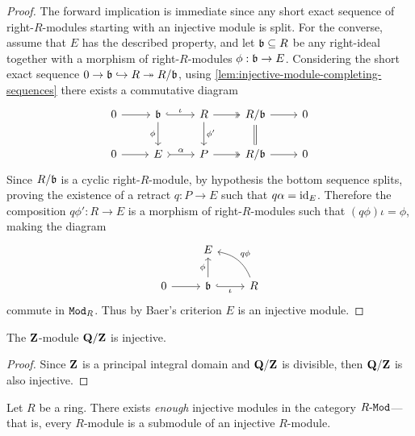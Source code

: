 \begin{proof}
    The forward implication is immediate since any short exact sequence of
    right-\(R\)-modules starting with an injective module is split. For the
    converse, assume that \(E\) has the described property, and let
    \(\mathfrak{b} \subseteq R\) be any right-ideal together with a morphism of
    right-\(R\)-modules \(\phi: \mathfrak{b} \to E\). Considering the short exact
    sequence \(0 \to \mathfrak{b} \hookrightarrow R \twoheadrightarrow R/{\mathfrak{b}}\), using
    \cref{lem:injective-module-completing-sequences} there exists a commutative
    diagram
    \[
        \begin{tikzcd}
            0 \ar[r]
            &\ideal b \ar[r, hook, "\iota"] \ar[d, "\phi"']
            &R \ar[r, two heads] \ar[d, "\phi'"]
            &R/{\ideal b} \ar[d, equals] \ar[r]
            &0
            \\
            0 \ar[r]
            &E \ar[r, tail, "\alpha"]
            &P \ar[r, two heads]
            &R/{\ideal b} \ar[r]
            &0
        \end{tikzcd}
    \]
    Since \(R/{\mathfrak{b}}\) is a cyclic right-\(R\)-module, by hypothesis the bottom
    sequence splits, proving the existence of a retract \(q: P \to E\) such that
    \(q \alpha = \operatorname{id}_E\). Therefore the composition \(q \phi': R \to E\) is a
    morphism of right-\(R\)-modules such that \((q \phi) \iota = \phi\), making the
    diagram
    \[
        \begin{tikzcd}
            &E &
            \\
            0 \ar[r]
            &\ideal b \ar[r, hook, "\iota"'] \ar[u, "\phi"]
            &R \ar[lu, bend right, "q \phi"']
        \end{tikzcd}
    \]
    commute in \({\texttt{Mod}_{R}}\). Thus by Baer's criterion \(E\) is an injective module.
\end{proof}

\begin{example}
    \label{exp:QZ-is-injective-Z-module}
    The \(\mathbf{Z}\)-module \(\mathbf{Q}/\mathbf{Z}\) is injective.
\end{example}

\begin{proof}
    Since \(\mathbf{Z}\) is a principal integral domain and \(\mathbf{Q}/\mathbf{Z}\) is divisible, then
    \(\mathbf{Q}/\mathbf{Z}\) is also injective.
\end{proof}

\begin{theorem}
    \label{thm:every-module-submodule-of-injective}
    Let \(R\) be a ring. There exists \emph{enough} injective modules in the
    category \({R\text{-}\texttt{Mod}}\)---that is, every \(R\)-module is a submodule of an injective
    \(R\)-module.
\end{theorem}

